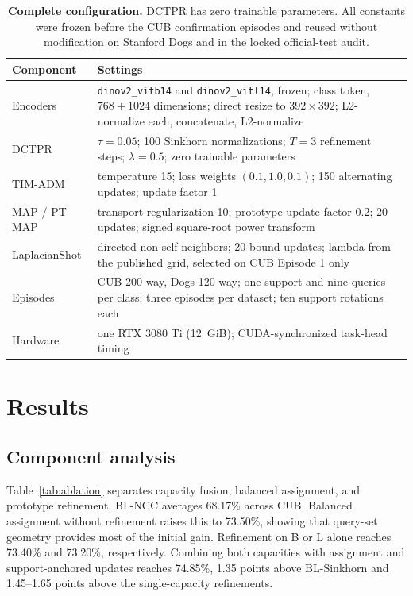 \documentclass[]{spie}
\newcommand{\method}{\textsc{DCTPR}\xspace}
\begin{document}
\begin{table}[!htbp]
\centering
\caption{\textbf{Complete configuration.} \method has zero trainable parameters.
All constants were frozen before the CUB confirmation episodes and reused
without modification on Stanford Dogs and in the locked official-test audit.}
\label{tab:hyperparams}
\small
\begin{tabular}{@{}lp{}@{}}
\toprule
Component & Settings \\
\midrule
Encoders & \texttt{dinov2\_vitb14} and \texttt{dinov2\_vitl14}, frozen; class token,
$768{+}1024$ dimensions; direct resize to $392\times392$; L2-normalize each,
concatenate, L2-normalize \\
\method & $\tau=0.05$; 100 Sinkhorn normalizations; $T=3$ refinement steps;
$\lambda=0.5$; zero trainable parameters \\
TIM-ADM & temperature 15; loss weights $(0.1,1.0,0.1)$; 150 alternating
updates; update factor 1 \\
MAP / PT-MAP & transport regularization 10; prototype update factor 0.2; 20
updates; signed square-root power transform \\
LaplacianShot & directed non-self neighbors; 20 bound updates; lambda from the
published grid, selected on CUB Episode 1 only \\
Episodes & CUB 200-way, Dogs 120-way; one support and nine queries per class;
three episodes per dataset; ten support rotations each \\
Hardware & one RTX 3080 Ti (12~GiB); CUDA-synchronized task-head timing \\
\bottomrule
\end{tabular}
\end{table}

\section{Results}
\label{sec:results}

\subsection{Component analysis}
\label{sec:ablation}

Table~\ref{tab:ablation} separates capacity fusion, balanced assignment, and
prototype refinement. BL-NCC averages 68.17\% across CUB. Balanced assignment
without refinement raises this to 73.50\%, showing that query-set geometry
provides most of the initial gain. Refinement on B or L alone reaches 73.40\%
and 73.20\%, respectively. Combining both capacities with assignment and
support-anchored updates reaches 74.85\%, 1.35 points above BL-Sinkhorn and
1.45--1.65 points above the single-capacity refinements.
\end{document}
